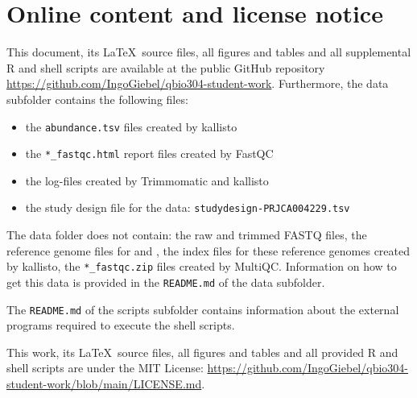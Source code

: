 \section{Online content and license notice}

This document, its \LaTeX\ source files, all figures and tables and all supplemental R and shell scripts are available at the public GitHub repository \url{https://github.com/IngoGiebel/qbio304-student-work}. Furthermore, the data subfolder contains the following files:
\begin{itemize}
    \item the \verb|abundance.tsv| files created by kallisto
    \item the \verb|*_fastqc.html| report files created by FastQC
    \item the log-files created by Trimmomatic and kallisto
    \item the study design file for the data: \verb|studydesign-PRJCA004229.tsv|
\end{itemize}
The data folder does not contain: the raw and trimmed FASTQ files, the reference genome files for  and , the index files for these reference genomes created by kallisto, the \verb|*_fastqc.zip| files created by MultiQC. Information on how to get this data is provided in the \verb|README.md| of the data subfolder.

The \verb|README.md| of the scripts subfolder contains information about the external programs required to execute the shell scripts.

This work, its \LaTeX\ source files, all figures and tables and all provided R and shell scripts are under the MIT License: \url{https://github.com/IngoGiebel/qbio304-student-work/blob/main/LICENSE.md}.